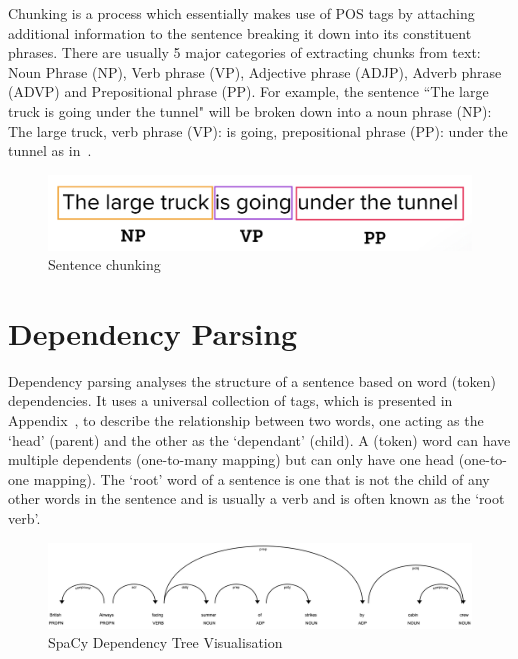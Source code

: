 Chunking is a process which essentially makes use of POS tags by attaching additional information to the sentence breaking it down into its constituent phrases. There are usually 5 major categories of extracting chunks from text: Noun Phrase (NP), Verb phrase (VP), Adjective phrase (ADJP), Adverb phrase (ADVP) and Prepositional phrase (PP). 
For example, the sentence ``The large truck is going under the tunnel" will be broken down into a noun phrase (NP): The large truck, verb phrase (VP): is going, prepositional phrase (PP): under the tunnel as in~.

\begin{figure}[H]
\centering
\includegraphics[scale=0.35]{images/chunking.png}
\caption{Sentence chunking}
\label{fig:chunking}
\end{figure}



\section{Dependency Parsing} \label{dependency_grammar}

Dependency parsing analyses the structure of a sentence based on word (token) dependencies. It uses a universal collection of tags, which is presented in Appendix~, to describe the relationship between two words, one acting as the `head' (parent) and the other as the `dependant' (child). A (token) word can have multiple dependents (one-to-many mapping) but can only have one head (one-to-one mapping). The `root' word of a sentence is one that is not the child of any other words in the sentence and is usually a verb and is often known as the `root verb'.

\begin{figure}[H]
    \centering
    \includegraphics[width=\textwidth]{images/displayCy.png}
    \caption{SpaCy Dependency Tree Visualisation~\cite{spacy_ling}}
    \label{fig:displacy}
\end{figure}

